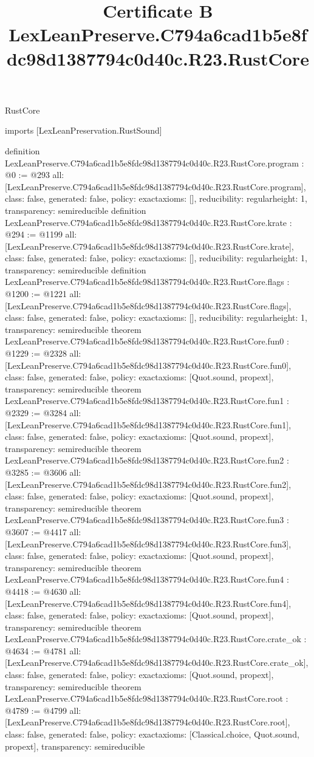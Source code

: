 \begin{lexlean}{RustCore}
\title{Certificate B LexLeanPreserve.C794a6cad1b5e8fdc98d1387794c0d40c.R23.RustCore}
\begin{coremodule}
imports [LexLeanPreservation.RustSound]

definition LexLeanPreserve.C794a6cad1b5e8fdc98d1387794c0d40c.R23.RustCore.program : @0 := @293 {
  all: [LexLeanPreserve.C794a6cad1b5e8fdc98d1387794c0d40c.R23.RustCore.program],
  class: false,
  generated: false,
  policy: exact{axioms: []},
  reducibility: regular{height: 1},
  transparency: semireducible
}
definition LexLeanPreserve.C794a6cad1b5e8fdc98d1387794c0d40c.R23.RustCore.krate : @294 := @1199 {
  all: [LexLeanPreserve.C794a6cad1b5e8fdc98d1387794c0d40c.R23.RustCore.krate],
  class: false,
  generated: false,
  policy: exact{axioms: []},
  reducibility: regular{height: 1},
  transparency: semireducible
}
definition LexLeanPreserve.C794a6cad1b5e8fdc98d1387794c0d40c.R23.RustCore.flags : @1200 := @1221 {
  all: [LexLeanPreserve.C794a6cad1b5e8fdc98d1387794c0d40c.R23.RustCore.flags],
  class: false,
  generated: false,
  policy: exact{axioms: []},
  reducibility: regular{height: 1},
  transparency: semireducible
}
theorem LexLeanPreserve.C794a6cad1b5e8fdc98d1387794c0d40c.R23.RustCore.fun0 : @1229 := @2328 {
  all: [LexLeanPreserve.C794a6cad1b5e8fdc98d1387794c0d40c.R23.RustCore.fun0],
  class: false,
  generated: false,
  policy: exact{axioms: [Quot.sound, propext]},
  transparency: semireducible
}
theorem LexLeanPreserve.C794a6cad1b5e8fdc98d1387794c0d40c.R23.RustCore.fun1 : @2329 := @3284 {
  all: [LexLeanPreserve.C794a6cad1b5e8fdc98d1387794c0d40c.R23.RustCore.fun1],
  class: false,
  generated: false,
  policy: exact{axioms: [Quot.sound, propext]},
  transparency: semireducible
}
theorem LexLeanPreserve.C794a6cad1b5e8fdc98d1387794c0d40c.R23.RustCore.fun2 : @3285 := @3606 {
  all: [LexLeanPreserve.C794a6cad1b5e8fdc98d1387794c0d40c.R23.RustCore.fun2],
  class: false,
  generated: false,
  policy: exact{axioms: [Quot.sound, propext]},
  transparency: semireducible
}
theorem LexLeanPreserve.C794a6cad1b5e8fdc98d1387794c0d40c.R23.RustCore.fun3 : @3607 := @4417 {
  all: [LexLeanPreserve.C794a6cad1b5e8fdc98d1387794c0d40c.R23.RustCore.fun3],
  class: false,
  generated: false,
  policy: exact{axioms: [Quot.sound, propext]},
  transparency: semireducible
}
theorem LexLeanPreserve.C794a6cad1b5e8fdc98d1387794c0d40c.R23.RustCore.fun4 : @4418 := @4630 {
  all: [LexLeanPreserve.C794a6cad1b5e8fdc98d1387794c0d40c.R23.RustCore.fun4],
  class: false,
  generated: false,
  policy: exact{axioms: [Quot.sound, propext]},
  transparency: semireducible
}
theorem LexLeanPreserve.C794a6cad1b5e8fdc98d1387794c0d40c.R23.RustCore.crate_ok : @4634 := @4781 {
  all: [LexLeanPreserve.C794a6cad1b5e8fdc98d1387794c0d40c.R23.RustCore.crate_ok],
  class: false,
  generated: false,
  policy: exact{axioms: [Quot.sound, propext]},
  transparency: semireducible
}
theorem LexLeanPreserve.C794a6cad1b5e8fdc98d1387794c0d40c.R23.RustCore.root : @4789 := @4799 {
  all: [LexLeanPreserve.C794a6cad1b5e8fdc98d1387794c0d40c.R23.RustCore.root],
  class: false,
  generated: false,
  policy: exact{axioms: [Classical.choice, Quot.sound, propext]},
  transparency: semireducible
}


\end{coremodule}
\end{lexlean}
